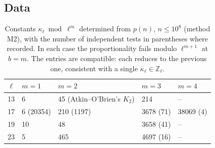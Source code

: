 \documentclass[11pt]{amsart}
\newcommand{\Zl}{\mathbb{Z}_\ell}
\theoremstyle{plain}
\theoremstyle{definition}
\numberwithin{equation}{section}
\begin{document}
\subsection{Data}
\begin{table}[ht]
\centering\small
\caption{Constants $\kappa_\ell\bmod\ell^m$ determined from $p(n)$, $n\le10^8$ (method M2), with the number of independent tests in
parentheses where recorded. In each case the proportionality fails modulo $\ell^{m+1}$ at $b=m$. The entries are compatible:
each reduces to the previous one, consistent with a single $\kappa_\ell\in\Zl$.}\label{tab:kappa}
\begin{tabular}{@{}rllll@{}}
\toprule
$\ell$ & $m=1$ & $m=2$ & $m=3$ & $m=4$\\
\midrule
13 & 6 & 45 (Atkin--O'Brien's $K_2$) & 214 & --\\
17 & 6 (20354) & 210 (1197) & 3678 (71) & 38069 (4)\\
19 & 10 & 48 & 3658 (41) & --\\
23 & 5 & 465 & 4697 (16) & --\\
\bottomrule
\end{tabular}
\end{table}
\end{document}

